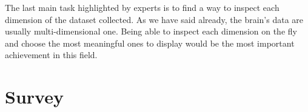 \documentclass{article}
\begin{document}
\begin{multicols}{2}
The last main task highlighted by experts is to find a way to inspect each dimension of the dataset collected. As we have said already, the brain's data are usually multi-dimensional one. Being able to inspect each dimension on the fly and choose the most meaningful ones to display would be the most important achievement in this field.
%
%
%				

\section{Survey}
\label{sec:survey}




\begin{figure}[ht]
	\centering     
\end{figure}
\end{multicols}
\end{document}
